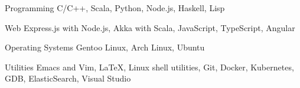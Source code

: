 


\begin{cvskills}


  \cvskill
  {Programming}
  {C/C++, Scala, Python, Node.js, Haskell, Lisp}


  \cvskill
  {Web}
  {Express.js with Node.js, Akka with Scala, JavaScript, TypeScript, Angular}


  \cvskill
  {Operating Systems}
  {Gentoo Linux, Arch Linux, Ubuntu}

  \cvskill
  {Utilities}
  {Emacs and Vim, \LaTeX, Linux shell utilities, Git, Docker,
    Kubernetes, GDB, ElasticSearch, Visual Studio}


\end{cvskills}

